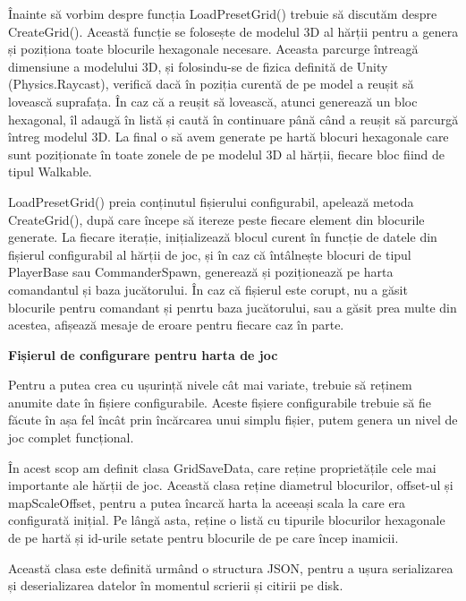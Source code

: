 \documentclass[12pt, a4paper]{article}
\begin{document}
	Înainte să vorbim despre funcția LoadPresetGrid() trebuie să discutăm despre CreateGrid(). Această funcție se folosește de modelul 3D al hărții pentru a genera și poziționa toate blocurile hexagonale necesare. Aceasta parcurge întreagă dimensiune a modelului 3D, și folosindu-se de fizica definită de Unity (Physics.Raycast), verifică dacă în poziția curentă de pe model a reușit să lovească suprafața. În caz că a reușit să lovească, atunci generează un bloc hexagonal, îl adaugă în listă și caută în continuare până când a reușit să parcurgă întreg modelul 3D. La final o să avem generate pe hartă blocuri hexagonale care sunt poziționate în toate zonele de pe modelul 3D al hărții, fiecare bloc fiind de tipul Walkable.
	\newline
	
	LoadPresetGrid() preia conținutul fișierului configurabil, apelează metoda CreateGrid(), după care începe să itereze peste fiecare element din blocurile generate. La fiecare iterație, inițializează blocul curent în funcție de datele din fișierul configurabil al hărții de joc, și în caz că întâlnește blocuri de tipul PlayerBase sau CommanderSpawn, generează și poziționează pe harta comandantul și baza jucătorului. În caz că fișierul este corupt, nu a găsit blocurile pentru comandant și penrtu baza jucătorului, sau a găsit prea multe din acestea, afișează mesaje de eroare pentru fiecare caz în parte.
	\newline
	
	
	
	
	
	\textbf{Fișierul de configurare pentru harta de joc}
	
	Pentru a putea crea cu ușurință nivele cât mai variate, trebuie să reținem anumite date în fișiere configurabile. Aceste fișiere configurabile trebuie să fie făcute în așa fel încât prin încărcarea unui simplu fișier, putem genera un nivel de joc complet funcțional.
	\newline
	
	În acest scop am definit clasa GridSaveData, care reține proprietățile cele mai importante ale hărții de joc. Această clasa reține diametrul blocurilor, offset-ul și mapScaleOffset, pentru a putea încarcă harta la aceeași scala la care era configurată inițial. Pe lângă asta, reține o listă cu tipurile blocurilor hexagonale de pe hartă și id-urile setate pentru blocurile de pe care încep inamicii.
	\newline
	
	Această clasa este definită urmând o structura JSON, pentru a ușura serializarea și deserializarea datelor în momentul scrierii și citirii pe disk.
	\newline
	
\end{document}
